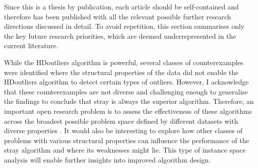 \documentclass{monashthesis}
\theoremstyle{definition}
\theoremstyle{definition}
\theoremstyle{definition}
\theoremstyle{remark}
\begin{document}
Since this is a thesis by publication, each article should be self-contained and therefore has been published with all the relevant possible further research directions discussed in detail. To avoid repetition, this section summarises only the key future research priorities, which are deemed underrepresented in the current literature.

While the HDoutliers algorithm is powerful, several classes of counterexamples were identified where the structural properties of the data did not enable the HDoutliers algorithm to detect certain types of outliers. However, I acknowledge that these counterexamples are not diverse and challenging enough to generalise the findings to conclude that stray is always the superior algorithm. Therefore, an important open research problem is to assess the effectiveness of these algorithms across the broadest possible problem space defined by different datasets with diverse properties \autocite{kang2017visualising}. It would also be interesting to explore how other classes of problems with various structural properties can influence the performance of the stray algorithm and where its weaknesses might lie. This type of instance space analysis \autocite{smith2014towards} will enable further insights into improved algorithm design.
\end{document}
